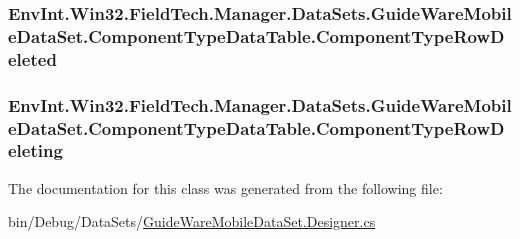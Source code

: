 \subsubsection[{Component\+Type\+Row\+Deleted}]{ Env\+Int.\+Win32.\+Field\+Tech.\+Manager.\+Data\+Sets.\+Guide\+Ware\+Mobile\+Data\+Set.\+Component\+Type\+Data\+Table.\+Component\+Type\+Row\+Deleted}\label{class_env_int_1_1_win32_1_1_field_tech_1_1_manager_1_1_data_sets_1_1_guide_ware_mobile_data_set_1_1_component_type_data_table_a89415d1154577bf0446e6b9ea70d31f2}
\hypertarget{class_env_int_1_1_win32_1_1_field_tech_1_1_manager_1_1_data_sets_1_1_guide_ware_mobile_data_set_1_1_component_type_data_table_a423421a5ae7a090ecb1862b3176e1f86}{}
\subsubsection[{Component\+Type\+Row\+Deleting}]{ Env\+Int.\+Win32.\+Field\+Tech.\+Manager.\+Data\+Sets.\+Guide\+Ware\+Mobile\+Data\+Set.\+Component\+Type\+Data\+Table.\+Component\+Type\+Row\+Deleting}\label{class_env_int_1_1_win32_1_1_field_tech_1_1_manager_1_1_data_sets_1_1_guide_ware_mobile_data_set_1_1_component_type_data_table_a423421a5ae7a090ecb1862b3176e1f86}


The documentation for this class was generated from the following file\+:\begin{DoxyCompactItemize}
\item 
bin/\+Debug/\+Data\+Sets/\hyperlink{bin_2_debug_2_data_sets_2_guide_ware_mobile_data_set_8_designer_8cs}{Guide\+Ware\+Mobile\+Data\+Set.\+Designer.\+cs}\end{DoxyCompactItemize}
